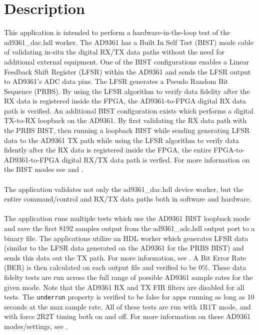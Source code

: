 \section{Description}
This application is intended to perform a hardware-in-the-loop test of the ad9361\_dac.hdl worker. The AD9361 has a Built In Self Test (BIST) mode cable of validating in-situ the digital RX/TX data paths without the need for additional external equipment. One of the BIST configurations enables a Linear Feedback Shift Register (LFSR) within the AD9361 and sends the LFSR output to AD9361's ADC data pins. The LFSR generates a Pseudo Random Bit Sequence (PRBS). By using the LFSR algorithm to verify data fidelity after the RX data is registered inside the FPGA, the AD9361-to-FPGA digital RX data path is verified. An additional BIST configuration exists which performs a digital TX-to-RX loopback on the AD9361. By first validating the RX data path with the PRBS BIST, then running a loopback BIST while sending generating LFSR data to the AD9361 TX path while using the LFSR algorithm to verify data fidently after the RX data is registered inside the FPGA, the entire FPGA-to-AD9361-to-FPGA digital RX/TX data path is verfied. For more information on the BIST modes see \cite{adi_bist_doc} and \cite{adi_ug570}. \\ \\
The application validates not only the ad9361\_dac.hdl device worker, but the entire command/control and RX/TX data paths both in software and hardware. \\ \\
The application runs multiple tests which use the AD9361 BIST loopback mode and save the first 8192 samples output from the ad9361\_adc.hdl output port to a binary file. The applications utilize an HDL worker which generates LFSR data (similar to the LFSR data generated on the AD9361 for the PRBS BIST) and sends this data out the TX path. For more information, see \cite{data_src_comp_datasheet}. A Bit Error Rate (BER) is then calculated on each output file and verified to be 0\%. These data fidelty tests are run across the full range of possible AD9361 sample rates for the given mode. Note that the AD9361 RX and TX FIR filters are disabled for all tests. The \verb+underrun+ property is verified to be false for apps running as long as 10 seconds at the max sample rate. All of these tests are run with 1R1T mode, and with force 2R2T timing both on and off. For more information on these AD9361 modes/settings, see \cite{adi_ug570}.

